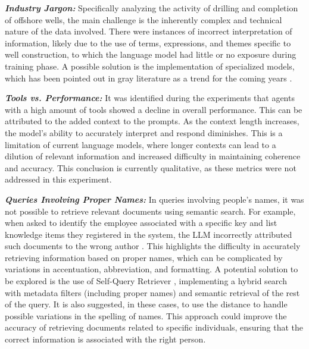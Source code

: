                 \textbf{\textit{Industry Jargon:}}
                    Specifically analyzing the activity of drilling and completion of offshore wells, the main challenge is the inherently complex and technical nature of the data involved. 
                    There were instances of incorrect interpretation of information, likely due to the use of terms, expressions, and themes specific to well construction, to which the language model had little or no exposure during training phase. 
                    A possible solution is the implementation of specialized models, which has been pointed out in gray literature as a trend for the coming years \citep{Shah2024, Meena2023, Ghosh2023}.
                
                \textbf{\textit{Tools vs. Performance:}} 
                    It was identified during the experiments that agents with a high amount of tools showed a decline in overall performance. 
                    This can be attributed to the added context to the prompts. 
                    As the context length increases, the model's ability to accurately interpret and respond diminishes.
                    This is a limitation of current language models, where longer contexts can lead to a dilution of relevant information and increased difficulty in maintaining coherence and accuracy. 
                    This conclusion is currently qualitative, as these metrics were not addressed in this experiment.

                
                \textbf{\textit{Queries Involving Proper Names:}}
                    In queries involving people's names, it was not possible to retrieve relevant documents using semantic search. 
                    For example, when asked to identify the employee associated with a specific key and list knowledge items they registered in the system, the LLM incorrectly attributed such documents to the wrong author
                    . 
                    This highlights the difficulty in accurately retrieving information based on proper names, which can be complicated by variations in accentuation, abbreviation, and formatting.
                    A potential solution to be explored is the use of Self-Query Retriever \citep{LangchainSelfQuery2023}, implementing a hybrid search with metadata filters (including proper names) and semantic retrieval of the rest of the query. 
                    It is also suggested, in these cases, to use the \citep{Levenshtein1966} distance to handle possible variations in the spelling of names. 
                    This approach could improve the accuracy of retrieving documents related to specific individuals, ensuring that the correct information is associated with the right person.
                    
